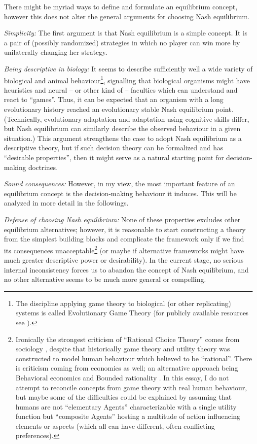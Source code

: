 \documentclass{article}
\begin{document}
There might be myriad ways to define and formulate an equilibrium concept, however this does not alter the general arguments for choosing Nash equilibrium.

{\it Simplicity:}
The first argument is that Nash equilibrium is a simple concept. It is a pair of (possibly randomized) strategies in which no player can win more by unilaterally changing her strategy.

{\it Being descriptive in biology:}
It seems to describe sufficiently well a wide variety of biological and animal behaviour\footnote{The discipline applying game theory to biological (or other replicating) systems is called Evolutionary Game Theory \cite{book:EvolutionaryGames,book:DarwinianDynamics} (for publicly available resources see \cite{sep:EvolutionaryGameTheory,thesis:GameTheoreticModelsOfAnimalBehavior}).}, signalling that biological organisms might have heuristics and neural -- or other kind of -- faculties which can understand and react to ``games''. Thus, it can be expected that an organism with a long evolutionary history reached an evolutionary stable Nash equilibrium point. (Technically, evolutionary adaptation and adaptation using cognitive skills differ, but Nash equilibrium can similarly describe the observed behaviour in a given situation.)
This argument strengthens the case to adopt Nash equilibrium as a descriptive theory, but if such decision theory can be formalized and has ``desirable properties'', then it might serve as a natural starting point for decision-making doctrines.

{\it Sound consequences:}
However, in my view, the most important feature of an equilibrium concept is the decision-making behaviour it induces. This will be analyzed in more detail in the followings.

{\it Defense of choosing Nash equilibrium:}
None of these properties excludes other equilibrium alternatives; however, it is reasonable to start constructing a theory from the simplest building blocks and complicate the framework only if we find its consequences unacceptable\footnote{Ironically the strongest criticism of ``Rational Choice Theory'' comes from sociology \cite{paper:BeyondRationalChoiceTheory}, despite that historically game theory and utility theory was constructed to model human behaviour which believed to be ``rational''. There is criticism coming from economics as well; an alternative approach being Behavioral economics \cite{paper:Tversky,book:Tversky} and Bounded rationality \cite{sep:BoundedRationality}. In this essay, I do not attempt to reconcile concepts from game theory with real human behaviour, but maybe some of the difficulties could be explained by assuming that humans are not ``elementary Agents'' characterizable with a single utility function but ``composite Agents'' hosting a multitude of action influencing elements or aspects (which all can have different, often conflicting preferences).} (or maybe if alternative frameworks might have much greater descriptive power or desirability).
In the current stage, no serious internal inconsistency forces us to abandon the concept of Nash equilibrium, and no other alternative seems to be much more general or compelling.
\end{document}
